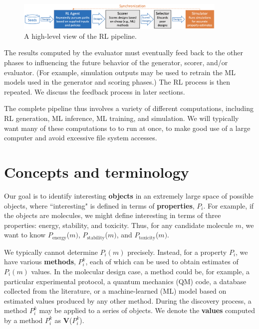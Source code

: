 \documentclass[10pt]{article}
\begin{document}
\begin{figure}[h]
  \centering
  \includegraphics[width=0.9\textwidth,trim=0in 0in 0in 0in,clip]{./Figs/pipe.png}
  \vspace{-1.5ex}
  \caption{A high-level view of the RL pipeline.}
\label{fig:pipe}
\end{figure}


The results computed by the evaluator must eventually feed back to the other phases to influencing the future behavior of the generator, scorer, and/or evaluator. 
(For example, simulation outputs may be used to retrain the ML models used in the generator and scoring phases.)
The RL process is then repeated.
We discuss the feedback process in later sections.

The complete pipeline thus involves a variety of different computations, including RL generation,  ML inference, ML training, and simulation.
We will typically want many of these computations to to run at once, to make good use of a large computer and avoid excessive file system accesses.


\section{Concepts and terminology}

Our goal is to identify interesting \textbf{objects} in an extremely large space of possible objects,
where ``interesting" is defined in terms of \textbf{properties}, $P_i$.
For example, if the objects are molecules, we might define interesting in terms of three properties: energy, stability, and toxicity.
Thus, for any candidate molecule $m$, we want to know $P_{\textrm{energy}}$($m)$, $P_{\textrm{stability}}$($m)$, and $P_{\textrm{toxicity}}$($m)$.

We typically cannot determine $P_i(m)$ precisely. Instead, for a property $P_i$, we have various \textbf{methods}, $P_i^k$, 
each of which can be used to obtain estimates of $P_i(m)$ values. In the molecular design case, a method could be, for example, 
a particular experimental protocol,
a quantum mechanics (QM) code,
a database collected from the literature, or
a machine-learned (ML) model based on estimated values produced by any other method.
During the discovery process, a method $P_i^k$ may be applied to a series of objects. 
We denote the \textbf{values} computed by a method $P_i^k$ as \textbf{V}($P_i^k$).
\end{document}
